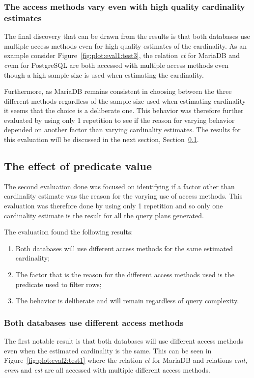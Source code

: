 \subsubsection{The access methods vary even with high quality cardinality estimates}
The final discovery that can be drawn from the results is that both databases
use multiple access methods even for high quality estimates of the cardinality.
As an example consider Figure~\ref{fig:plot:eval1:test3}, the relation
\textit{ct} for MariaDB and \textit{cm}m for PostgreSQL are both accessed with
multiple access methods even though a high sample size is used when estimating
the cardinality.

Furthermore, as MariaDB remains consistent in choosing between the three
different methods regardless of the sample size used when estimating cardinality
it seems that the choice is a deliberate one. This behavior was therefore
further evaluated by using only 1 repetition to see if the reason for varying
behavior depended on another factor than varying cardinality estimates. The
results for this evaluation will be discussed in the next section,
Section~\ref{sec:predicatecorrelation}.

\subsection{The effect of predicate value}\label{sec:predicatecorrelation}
The second evaluation done was focused on identifying if a factor other than
cardinality estimate was the reason for the varying use of access methods. This
evaluation was therefore done by using only 1 repetition and so only one
cardinality estimate is the result for all the query plans generated.

The evaluation found the following results:
\begin{enumerate}
\item Both databases will use different access methods for the same estimated
  cardinality;
\item The factor that is the reason for the different access methods used is the
  predicate used to filter rows;
\item The behavior is deliberate and will remain regardless of query complexity.
\end{enumerate}

\subsubsection{Both databases use different access methods}
The first notable result is that both databases will use different access
methods even when the estimated cardinality is the same. This can be
seen in Figure~\ref{fig:plot:eval2:test1} where the relation \textit{ct} for
MariaDB and relations \textit{cmt}, \textit{cmm} and \textit{est} are all
accessed with multiple different access methods.

